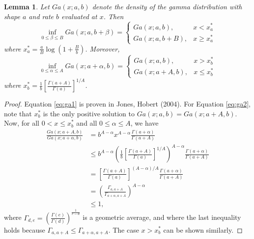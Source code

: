 \documentclass[11pt]{article}
\newtheorem{lemma}{Lemma}[section]
\begin{document}
	\begin{lemma}
		\label{pro:ga1}
		Let $Ga(x;a,b)$ denote the density of the gamma distribution with shape $a$ and rate $b$ evaluated at $x$. Then
		\begin{equation}
			\label{eq:ga1}
			\inf_{0\le \beta\le B} Ga(x;a,b+\beta) = 
			\begin{cases}
				Ga(x;a,b), & x<x_a^* \\ Ga(x;a,b+B), & x\ge x_a^*
			\end{cases}
		\end{equation}	
		where $x_a^*=\frac{a}{B}\log\left( 1+\frac{B}{b}\right) $. Moreover,
		\begin{equation}
			\label{eq:ga2}
			\inf_{0\le \alpha\le A} Ga(x;a+\alpha,b) = 
			\begin{cases}
				Ga(x;a,b), & x>x_b^* \\ Ga(x;a+A,b), & x\le x_b^*
			\end{cases}
		\end{equation}
		where $x_b^*=\frac{1}{b}\left[ \frac{\Gamma(a+A)}{\Gamma(a)}\right]^{1/A} $.
	\end{lemma}
	\begin{proof}
		Equation \ref{eq:ga1} is proven in Jones, Hobert (2004). For Equation \ref{eq:ga2}, note that $x_b^*$ is the only positive solution to $Ga(x;a,b) = Ga(x;a+A,b)$. Now, for all $0<x\le x_b^*$ and all $0\le\alpha\le A$, we have
		\begin{align*}
			\frac{Ga(x;a+A,b)}{Ga(x;a+\alpha,b)}
			& = b^{A-\alpha}x^{A-\alpha} \frac{\Gamma(a+\alpha)}{\Gamma(a+A)} \\
			& \le b^{A-\alpha}\left(\frac{1}{b}\left[ \frac{\Gamma(a+A)}{\Gamma(a)}\right]^{1/A} \right)^{A-\alpha} \frac{\Gamma(a+\alpha)}{\Gamma(a+A)} \\
			& = \left[ \frac{\Gamma(a+A)}{\Gamma(a)}\right]^{(A-\alpha)/A} \frac{\Gamma(a+\alpha)}{\Gamma(a+A)} \\
			& = \left( \frac{\Gamma_{a,a+A}}{\Gamma_{a+\alpha, a+A}}\right)^{A-\alpha} \\
			& \le 1,
		\end{align*}
		where $\Gamma_{d,e} = \left( \frac{\Gamma(e)}{\Gamma(d)} \right)^{\frac{1}{e-d}}$ is a geometric average,
		and where the last inequality holds because $\Gamma_{a,a+A}\le\Gamma_{a+\alpha, a+A}$.
		The case $x>x_b^*$ can be shown similarly.
	\end{proof}
	
\end{document}
